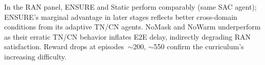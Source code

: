 \documentclass[12pt,lettersize,journal,onecolumn]{IEEEtran}
\begin{document}
In the RAN panel, ENSURE and Static perform comparably (same SAC agent); ENSURE's marginal advantage in later stages reflects better cross-domain conditions from its adaptive TN/CN agents. NoMask and NoWarm underperform as their erratic TN/CN behavior inflates E2E delay, indirectly degrading RAN satisfaction. Reward drops at episodes~${\sim}$200, ${\sim}$550 confirm the curriculum's increasing difficulty.
\end{document}
